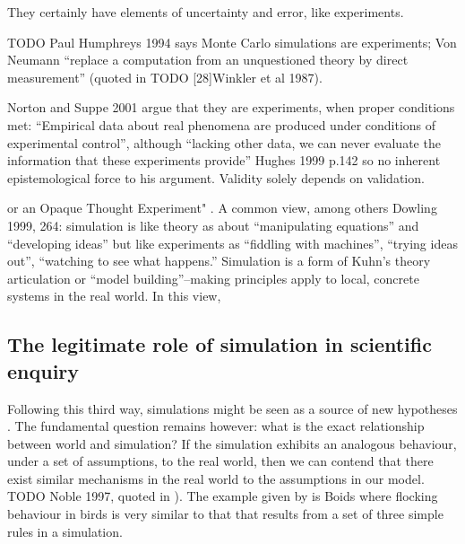 
They certainly have elements of uncertainty and error, like experiments.

TODO Paul Humphreys 1994 says Monte Carlo simulations are experiments; Von
Neumann ``replace a computation from an unquestioned theory by direct
measurement'' (quoted in TODO [28]{Winkler et al 1987}).

Norton and Suppe 2001 argue that they are experiments, when proper conditions met:
``Empirical
data about real phenomena are produced under conditions of experimental
control'', although ``lacking other data, we can never evaluate the
information that these experiments provide'' Hughes 1999 p.142 so no inherent epistemological force to his
argument. Validity solely depends on validation.

\label{a-third-way-neither-experimental-or-theoretical}

\autocite[31]{Winsberg2010} or an Opaque Thought Experiment"
\autocite{DiPaolo2000}. A common view, among others Dowling 1999, 264:
simulation is like theory as about ``manipulating equations'' and
``developing ideas'' but like experiments as ``fiddling with machines'',
``trying ideas out'', ``watching to see what happens.'' Simulation is a
form of Kuhn's theory articulation or ``model building''--making
principles apply to local, concrete systems in the real world. In this
view, 

\subsection{The legitimate role of simulation in scientific
	enquiry}\label{the-legitimate-role-of-simulation-in-scientific-enquiry}

Following this third way, simulations might be seen as a source of new
hypotheses \autocite{Eldridge}. The fundamental question remains
however: what is the exact relationship between world and simulation? If
the simulation exhibits an analogous behaviour, under a set of
assumptions, to the real world, then we can contend that there exist
similar mechanisms in the real world to the assumptions in our model.
TODO Noble 1997, quoted in \autocite{Eldridge}). The example given by
\autocite{Eldridge} is Boids \autocite{Reynolds1987} where flocking behaviour in
birds is very similar to that that results from a set of three simple
rules in a simulation.

